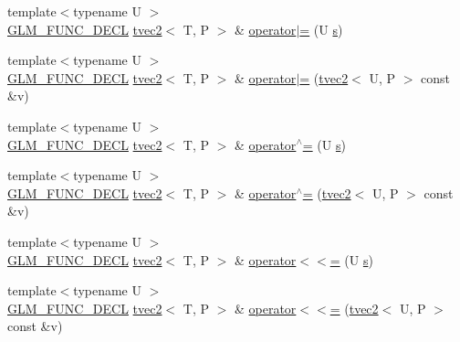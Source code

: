\begin{DoxyCompactItemize}
\item 
{\footnotesize template$<$typename U $>$ }\\\hyperlink{setup_8hpp_ab2d052de21a70539923e9bcbf6e83a51}{G\+L\+M\+\_\+\+F\+U\+N\+C\+\_\+\+D\+E\+CL} \hyperlink{structglm_1_1detail_1_1tvec2}{tvec2}$<$ T, P $>$ \& \hyperlink{structglm_1_1detail_1_1tvec2_a62015e8977847b4c13e0dd396802a5b0}{operator$\vert$=} (U \hyperlink{structglm_1_1detail_1_1tvec2_a6d602cf7c31b75396944d828ad2aea72}{s})
\item 
{\footnotesize template$<$typename U $>$ }\\\hyperlink{setup_8hpp_ab2d052de21a70539923e9bcbf6e83a51}{G\+L\+M\+\_\+\+F\+U\+N\+C\+\_\+\+D\+E\+CL} \hyperlink{structglm_1_1detail_1_1tvec2}{tvec2}$<$ T, P $>$ \& \hyperlink{structglm_1_1detail_1_1tvec2_aea5cce6a904468eb31c039643a18c9af}{operator$\vert$=} (\hyperlink{structglm_1_1detail_1_1tvec2}{tvec2}$<$ U, P $>$ const \&v)
\item 
{\footnotesize template$<$typename U $>$ }\\\hyperlink{setup_8hpp_ab2d052de21a70539923e9bcbf6e83a51}{G\+L\+M\+\_\+\+F\+U\+N\+C\+\_\+\+D\+E\+CL} \hyperlink{structglm_1_1detail_1_1tvec2}{tvec2}$<$ T, P $>$ \& \hyperlink{structglm_1_1detail_1_1tvec2_a5275bd243c23d0898f39e094da95b2a1}{operator$^\wedge$=} (U \hyperlink{structglm_1_1detail_1_1tvec2_a6d602cf7c31b75396944d828ad2aea72}{s})
\item 
{\footnotesize template$<$typename U $>$ }\\\hyperlink{setup_8hpp_ab2d052de21a70539923e9bcbf6e83a51}{G\+L\+M\+\_\+\+F\+U\+N\+C\+\_\+\+D\+E\+CL} \hyperlink{structglm_1_1detail_1_1tvec2}{tvec2}$<$ T, P $>$ \& \hyperlink{structglm_1_1detail_1_1tvec2_ad24ddb39053aaf91cbb40610e813fcac}{operator$^\wedge$=} (\hyperlink{structglm_1_1detail_1_1tvec2}{tvec2}$<$ U, P $>$ const \&v)
\item 
{\footnotesize template$<$typename U $>$ }\\\hyperlink{setup_8hpp_ab2d052de21a70539923e9bcbf6e83a51}{G\+L\+M\+\_\+\+F\+U\+N\+C\+\_\+\+D\+E\+CL} \hyperlink{structglm_1_1detail_1_1tvec2}{tvec2}$<$ T, P $>$ \& \hyperlink{structglm_1_1detail_1_1tvec2_a4c1990d9dd6b9a617a782c7272a3ba0b}{operator$<$$<$=} (U \hyperlink{structglm_1_1detail_1_1tvec2_a6d602cf7c31b75396944d828ad2aea72}{s})
\item 
{\footnotesize template$<$typename U $>$ }\\\hyperlink{setup_8hpp_ab2d052de21a70539923e9bcbf6e83a51}{G\+L\+M\+\_\+\+F\+U\+N\+C\+\_\+\+D\+E\+CL} \hyperlink{structglm_1_1detail_1_1tvec2}{tvec2}$<$ T, P $>$ \& \hyperlink{structglm_1_1detail_1_1tvec2_a0b22d5e95e2ecbd4024c04910db325ce}{operator$<$$<$=} (\hyperlink{structglm_1_1detail_1_1tvec2}{tvec2}$<$ U, P $>$ const \&v)

\end{DoxyCompactItemize}
